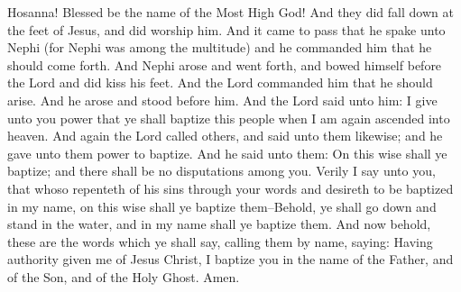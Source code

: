 \bverse \iffalse Hosanna! Blessed be the name of the Most High God! And they did fall down at the feet of Jesus, and did worship him. \fi
Hosanna! Blessed be the name of the Most High God! And they did fall down at the feet of Jesus, and did worship him.
\bverse \iffalse And it came to pass that he spake unto Nephi (for Nephi was among the multitude) and he commanded him that he should come forth. \fi
And it came to pass that he spake unto Nephi (for Nephi was among the multitude) and he commanded him that he should come forth.
\bverse \iffalse And Nephi arose and went forth, and bowed himself before the Lord and did kiss his feet. \fi
And Nephi arose and went forth, and bowed himself before the Lord and did kiss his feet.
\bverse \iffalse And the Lord commanded him that he should arise. And he arose and stood before him. \fi
And the Lord commanded him that he should arise. And he arose and stood before him.
\bverse \iffalse And the Lord said unto him: I give unto you power that ye shall baptize this people when I am again ascended into heaven. \fi
And the Lord said unto him: I give unto you power that ye shall baptize this people when I am again ascended into heaven.
\bverse \iffalse And again the Lord called others, and said unto them likewise; and he gave unto them power to baptize. And he said unto them: On this wise shall ye baptize; and there shall be no disputations among you. \fi
And again the Lord called others, and said unto them likewise; and he gave unto them power to baptize. And he said unto them: On this wise shall ye baptize; and there shall be no disputations among you.
\bverse \iffalse Verily I say unto you, that whoso repenteth of his sins through your words and desireth to be baptized in my name, on this wise shall ye baptize them--Behold, ye shall go down and stand in the water, and in my name shall ye baptize them. \fi
Verily I say unto you, that whoso repenteth of his sins through your words and desireth to be baptized in my name, on this wise shall ye baptize them--Behold, ye shall go down and stand in the water, and in my name shall ye baptize them.
\bverse \iffalse And now behold, these are the words which ye shall say, calling them by name, saying: \fi
And now behold, these are the words which ye shall say, calling them by name, saying:
\bverse \iffalse Having authority given me of Jesus Christ, I baptize you in the name of the Father, and of the Son, and of the Holy Ghost.  Amen. \fi
Having authority given me of Jesus Christ, I baptize you in the name of the Father, and of the Son, and of the Holy Ghost.  Amen.
